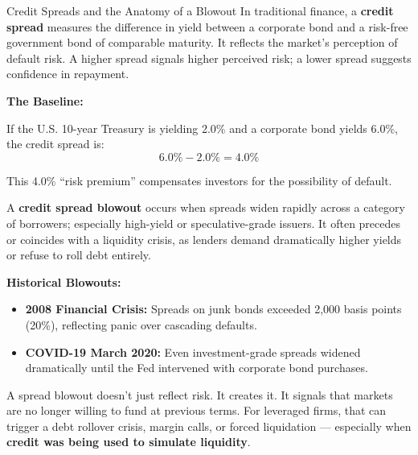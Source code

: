\medskip

\begin{TechnicalSidebar}{Credit Spreads and the Anatomy of a Blowout}
  In traditional finance, a \textbf{credit spread} measures the difference in yield between a corporate bond and a 
  risk-free government bond of comparable maturity. It reflects the market’s perception of default risk. A higher 
  spread signals higher perceived risk; a lower spread suggests confidence in repayment.
  
  \medskip
  
  \textbf{The Baseline:}  

  \medskip

  If the U.S. 10-year Treasury is yielding 2.0\% and a corporate bond yields 6.0\%, the credit spread is:
  \[
  6.0\% - 2.0\% = 4.0\%
  \]

  \medskip
  
  This 4.0\% “risk premium” compensates investors for the possibility of default.
  
  \medskip

  A \textbf{credit spread blowout} occurs when spreads widen rapidly across a category of borrowers; especially 
  high-yield or speculative-grade issuers. It often precedes or coincides with a liquidity crisis, as lenders 
  demand dramatically higher yields or refuse to roll debt entirely.
  
  \medskip
  
  \textbf{Historical Blowouts:}

  \medskip

  \begin{itemize}
    \item \textbf{2008 Financial Crisis:} Spreads on junk bonds exceeded 2,000 basis points (20\%), reflecting panic 
    over cascading defaults.
    \item \textbf{COVID-19 March 2020:} Even investment-grade spreads widened dramatically until the Fed intervened 
    with corporate bond purchases.
  \end{itemize}

  \medskip

  A spread blowout doesn’t just reflect risk. It creates it. It signals that markets are no longer willing to fund 
  at previous terms. For leveraged firms, that can trigger a debt rollover crisis, margin calls, or forced liquidation 
  — especially when \textbf{credit was being used to simulate liquidity}.

\end{TechnicalSidebar}

